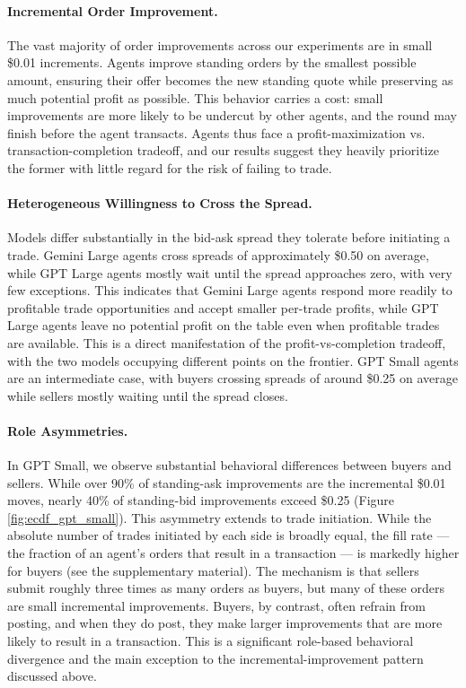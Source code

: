 \documentclass[letterpaper]{article} %
\begin{document}
\paragraph{Incremental Order Improvement.}
The vast majority of order improvements across our experiments are in small \$0.01 increments. Agents improve standing orders by the smallest possible amount, ensuring their offer becomes the new standing quote while preserving as much potential profit as possible. This behavior carries a cost: small improvements are more likely to be undercut by other agents, and the round may finish before the agent transacts. Agents thus face a profit-maximization vs. transaction-completion tradeoff, and our results suggest they heavily prioritize the former with little regard for the risk of failing to trade. 

\paragraph{Heterogeneous Willingness to Cross the Spread.}
Models differ substantially in the bid-ask spread they tolerate before initiating a trade. Gemini Large agents cross spreads of approximately \$0.50 on average, while GPT Large agents mostly wait until the spread approaches zero, with very few exceptions. This indicates that Gemini Large agents respond more readily to profitable trade opportunities and accept smaller per-trade profits, while GPT Large agents leave no potential profit on the table even when profitable trades are available. This is a direct manifestation of the profit-vs-completion tradeoff, with the two models occupying different points on the frontier. GPT Small agents are an intermediate case, with buyers crossing spreads of around \$0.25 on average while sellers mostly waiting until the spread closes.

\paragraph{Role Asymmetries.}
In GPT Small, we observe substantial behavioral differences between buyers and sellers. While over 90\% of standing-ask improvements are the incremental \$0.01 moves, nearly 40\% of standing-bid improvements exceed \$0.25 (Figure \ref{fig:ecdf_gpt_small}). This asymmetry extends to trade initiation. While the absolute number of trades initiated by each side is broadly equal, the fill rate — the fraction of an agent's orders that result in a transaction — is markedly higher for buyers (see the supplementary material). The mechanism is that sellers submit roughly three times as many orders as buyers, but many of these orders are small incremental improvements. Buyers, by contrast, often refrain from posting, and when they do post, they make larger improvements that are more likely to result in a transaction. This is a significant role-based behavioral divergence and the main exception to the incremental-improvement pattern discussed above.
\end{document}
